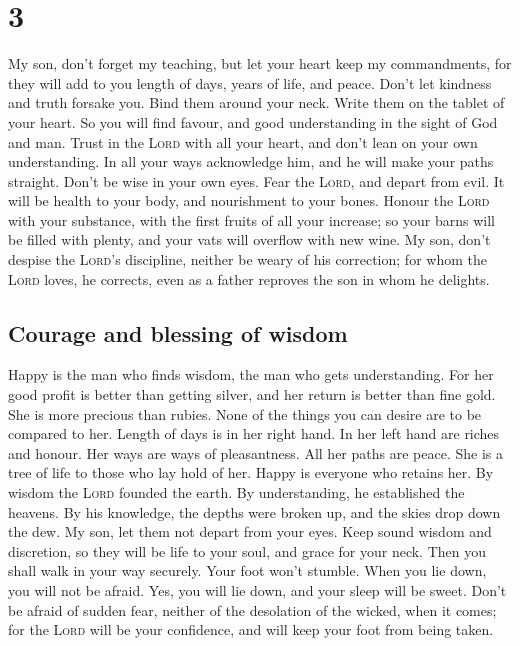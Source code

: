 \hypertarget{section-2}{%
\section{3}\label{section-2}}

 My son, don't forget my teaching, but let your heart keep
my commandments,  for they will add to you length of days,
years of life, and peace.  Don't let kindness and truth
forsake you. Bind them around your neck. Write them on the tablet of
your heart.  So you will find favour, and good
understanding in the sight of God and man.  Trust in the
\textsc{Lord} with all your heart, and don't lean on your own
understanding.  In all your ways acknowledge him, and he
will make your paths straight.  Don't be wise in your own
eyes. Fear the \textsc{Lord}, and depart from evil.  It
will be health to your body, and nourishment to your bones.
 Honour the \textsc{Lord} with your substance, with the
first fruits of all your increase;  so your barns will be
filled with plenty, and your vats will overflow with new wine.
 My son, don't despise the \textsc{Lord}'s discipline,
neither be weary of his correction;  for whom the
\textsc{Lord} loves, he corrects, even as a father reproves the son in
whom he delights.

\hypertarget{courage-and-blessing-of-wisdom}{%
\subsection{Courage and blessing of
wisdom}\label{courage-and-blessing-of-wisdom}}

 Happy is the man who finds wisdom, the man who gets
understanding.  For her good profit is better than
getting silver, and her return is better than fine gold. 
She is more precious than rubies. None of the things you can desire are
to be compared to her.  Length of days is in her right
hand. In her left hand are riches and honour.  Her ways
are ways of pleasantness. All her paths are peace.  She
is a tree of life to those who lay hold of her. Happy is everyone who
retains her.  By wisdom the \textsc{Lord} founded the
earth. By understanding, he established the heavens.  By
his knowledge, the depths were broken up, and the skies drop down the
dew.  My son, let them not depart from your eyes. Keep
sound wisdom and discretion,  so they will be life to
your soul, and grace for your neck.  Then you shall walk
in your way securely. Your foot won't stumble.  When you
lie down, you will not be afraid. Yes, you will lie down, and your sleep
will be sweet.  Don't be afraid of sudden fear, neither
of the desolation of the wicked, when it comes;  for the
\textsc{Lord} will be your confidence, and will keep your foot from
being taken.

